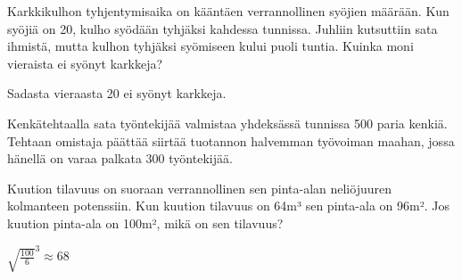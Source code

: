 \begin{tehtavasivu}
\begin{tehtava}
	Karkkikulhon tyhjentymisaika on kääntäen verrannollinen syöjien määrään. Kun syöjiä on 20, kulho syödään tyhjäksi kahdessa tunnissa. Juhliin kutsuttiin sata ihmistä, mutta kulhon tyhjäksi syömiseen kului puoli tuntia. Kuinka moni vieraista ei syönyt karkkeja?
	\begin{vastaus}
		Sadasta vieraasta 20 ei syönyt karkkeja.
	\end{vastaus}
\end{tehtava}

\begin{tehtava}
Kenkätehtaalla sata työntekijää valmistaa yhdeksässä tunnissa 500 paria kenkiä. Tehtaan omistaja päättää siirtää tuotannon halvemman työvoiman maahan, jossa hänellä on varaa palkata 300 työntekijää. 

\begin{alakohdat}
\end{alakohdat} 
\begin{vastaus}
\begin{alakohdat}
\end{alakohdat} 
\end{vastaus}
\end{tehtava}

\begin{tehtava}
	Kuution tilavuus on suoraan verrannollinen sen pinta-alan neliöjuuren kolmanteen potenssiin. Kun kuution tilavuus on 64m³ sen pinta-ala on 96m². Jos kuution pinta-ala on 100m², mikä on sen tilavuus?
	\begin{vastaus}
		${\sqrt{\frac{100}{6}}}^{3} \approx 68$
	\end{vastaus}
\end{tehtava}

\end{tehtavasivu}
